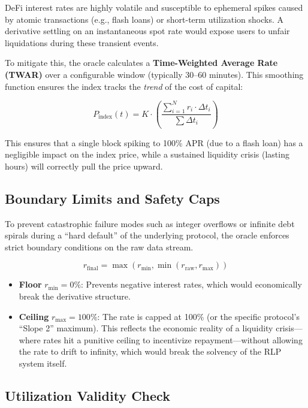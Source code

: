 \documentclass[12pt]{article}
\begin{document}
DeFi interest rates are highly volatile and susceptible to ephemeral spikes caused by atomic transactions (e.g., flash loans) or short-term utilization shocks. A derivative settling on an instantaneous spot rate would expose users to unfair liquidations during these transient events.

To mitigate this, the oracle calculates a \textbf{Time-Weighted Average Rate (TWAR)} over a configurable window (typically 30--60 minutes). This smoothing function ensures the index tracks the \emph{trend} of the cost of capital:

\begin{equation}
    P_{\text{index}}(t) = K \cdot \left( \frac{\sum_{i=1}^{N} r_i \cdot \Delta t_i}{\sum \Delta t_i} \right)
\end{equation}

This ensures that a single block spiking to 100\% APR (due to a flash loan) has a negligible impact on the index price, while a sustained liquidity crisis (lasting hours) will correctly pull the price upward.

\subsection{Boundary Limits and Safety Caps}

To prevent catastrophic failure modes such as integer overflows or infinite debt spirals during a ``hard default'' of the underlying protocol, the oracle enforces strict boundary conditions on the raw data stream.

\begin{equation}
    r_{\text{final}} = \max(r_{\min}, \min(r_{\text{raw}}, r_{\max}))
\end{equation}

\begin{itemize}
    \item \textbf{Floor} $r_{\min} = 0\%$: Prevents negative interest rates, which would economically break the derivative structure.
    \item \textbf{Ceiling} $r_{\max} = 100\%$: The rate is capped at 100\% (or the specific protocol's ``Slope 2'' maximum). This reflects the economic reality of a liquidity crisis---where rates hit a punitive ceiling to incentivize repayment---without allowing the rate to drift to infinity, which would break the solvency of the RLP system itself.
\end{itemize}

\subsection{Utilization Validity Check}
\end{document}
